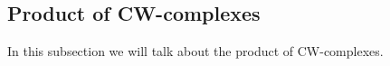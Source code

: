 \subsection{Product of CW-complexes}
In this subsection we will talk about the product of CW-complexes.



